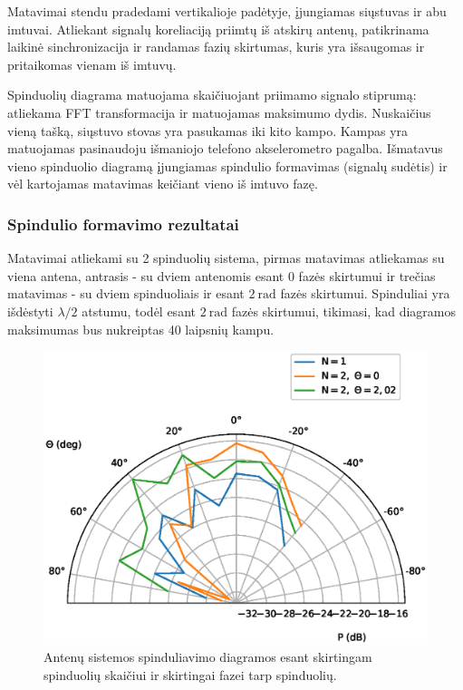 \documentclass[main.tex]{subfiles}
\begin{document}
Matavimai stendu pradedami vertikalioje padėtyje, įjungiamas siųstuvas ir abu imtuvai.
Atliekant signalų koreliaciją priimtų iš atskirų antenų, patikrinama laikinė sinchronizacija
ir randamas fazių skirtumas, kuris yra išsaugomas ir pritaikomas vienam iš imtuvų.

Spinduolių diagrama matuojama skaičiuojant priimamo signalo stiprumą: atliekama FFT
transformacija ir matuojamas maksimumo dydis. Nuskaičius vieną tašką, siųstuvo stovas
yra pasukamas iki kito kampo. Kampas yra matuojamas pasinaudoju išmaniojo telefono
akselerometro pagalba. Išmatavus vieno spinduolio diagramą įjungiamas spindulio formavimas
(signalų sudėtis) ir vėl kartojamas matavimas keičiant vieno iš imtuvo fazę.


\subsubsection{Spindulio formavimo rezultatai}

Matavimai atliekami su 2 spinduolių sistema, pirmas matavimas atliekamas su viena
antena, antrasis - su dviem antenomis esant 0 fazės skirtumui ir trečias matavimas - su dviem
spinduoliais ir esant $2\ \mathrm{rad}$ fazės skirtumui. Spinduliai yra išdėstyti $\lambda / 2$ atstumu,
todėl esant $2\ \mathrm{rad}$ fazės skirtumui, tikimasi, kad diagramos maksimumas bus nukreiptas 40 laipsnių
kampu.

\begin{figure}[h]
    \begin{centering}
    \includegraphics[scale=0.8]{drawings/beam_forming_results}
    \par\end{centering}
    \protect\caption{\label{fig:beamforming_result}Antenų sistemos spinduliavimo diagramos esant skirtingam spinduolių skaičiui
    ir skirtingai fazei tarp spinduolių.}
\end{figure}
\end{document}
